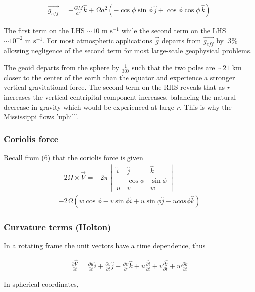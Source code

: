 \documentclass[a4paper,12pt]{article}
\begin{document}
\begin{align}
\vec{g_{eff}} = -\frac{GM}{a^2}\hat{k} + \Omega a^2(-\cos\phi\sin\phi \, \hat{j} + \cos\phi\cos\phi \, \hat{k})
\end{align}

The first term on the LHS $\sim 10 \text{ m s}^{-1}$ while the second term on the LHS $\sim 10^{-2} \text{ m s}^{-1}$. For most atmospheric applications $\vec{g}$ departs from $\vec{g_{eff}}$ by $.3\%$ allowing negligence of the second term for most large-scale geophysical problems. 

The geoid departs from the sphere by $\frac{1}{300}$ such that the two poles are $\sim 21 \text{ km}$ closer to the center of the earth than the equator and experience a stronger vertical gravitational force. The second term on the RHS reveals that as $r$ increases the vertical centripital component increases, balancing the natural decrease in gravity which would be experienced at large $r$. This is why the Mississippi flows 'uphill'.

\subsubsection*{Coriolis force}
Recall from (6) that the coriolis force is given
\begin{align}
-2\Omega \times \vec{V} = -2\pi\begin{vmatrix} \hat{i} & \hat{j} & \hat{k} \\ - & \cos\phi & \sin\phi \\ u & v & w \end{vmatrix}\\
-2\Omega(w\cos\phi-v\sin\phi \hat{i} + u\sin\phi \hat{j} - ucos\phi\hat{k})
\end{align}

\subsubsection*{Curvature terms (Holton)}
In a rotating frame the unit vectors have a time dependence, thus

\begin{align}
\frac{\partial\vec{V}}{\partial t} = \frac{\partial u}{\partial t} \hat{i} + \frac{\partial v}{\partial t} \hat{j} + \frac{\partial w}{\partial t} \hat{k} + u\frac{\partial \hat{i}}{\partial t} + v\frac{\partial \hat{j}}{\partial t} + w\frac{\partial \hat{k}}{\partial t}
\end{align}

In spherical coordinates,
\end{document}
